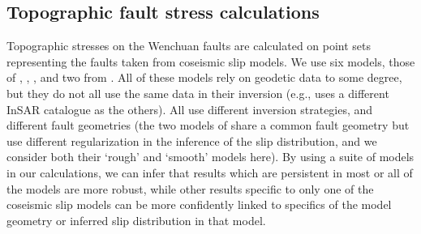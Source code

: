 \documentclass[draft,jgrga]{AGUTeX}
\begin{document}
\begin{article}

\subsection{Topographic fault stress
calculations}\label{topographic-fault-stress-calculations}

Topographic stresses on the Wenchuan faults are calculated on point sets
representing the faults taken from coseismic slip models. We use six models,
those of \citet{shen2009}, \citet{feng2010}, \citet{zhang2011},
\citet{fielding2013} and two from \citet{qi2011}.
All of these models rely on geodetic data to some degree, but they do not all 
use the same data in their inversion (e.g., \citep{feng2010} uses a different
InSAR catalogue as the others). All use different inversion strategies, and
different fault geometries (the two models of \citep{qi2011} share a common
fault geometry but use different regularization in the inference of the slip
distribution, and we consider both their `rough' and `smooth' models here). By using a suite of models in our calculations, we can infer
that results which are persistent in most or all of the models are more robust,
while other results specific to only one of the coseismic slip models can be
more confidently linked to specifics of the model geometry or inferred slip
distribution in that model. 


\end{article}
\end{document}
